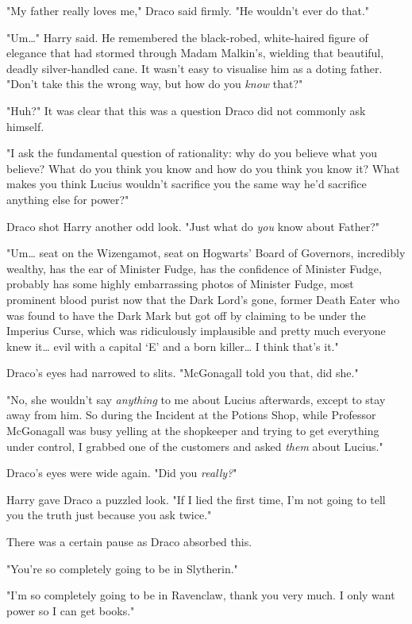 "My father really loves me," Draco said firmly. "He wouldn't ever do that."

"Um{\ldots}" Harry said. He remembered the black-robed, white-haired figure of
elegance that had stormed through Madam Malkin's, wielding that beautiful,
deadly silver-handled cane. It wasn't easy to visualise him as a doting father.
"Don't take this the wrong way, but how do you \emph{know} that?"

"Huh?" It was clear that this was a question Draco did not commonly ask himself.

"I ask the fundamental question of rationality: why do you believe what you
believe? What do you think you know and how do you think you know it? What
makes you think Lucius wouldn't sacrifice you the same way he'd sacrifice
anything else for power?"

Draco shot Harry another odd look. "Just what do \emph{you} know about Father?"

"Um{\ldots} seat on the Wizengamot, seat on Hogwarts' Board of Governors,
incredibly wealthy, has the ear of Minister Fudge, has the confidence of
Minister Fudge, probably has some highly embarrassing photos of Minister Fudge,
most prominent blood purist now that the Dark Lord's gone, former Death Eater
who was found to have the Dark Mark but got off by claiming to be under the
Imperius Curse, which was ridiculously implausible and pretty much everyone
knew it{\ldots} evil with a capital `E' and a born killer{\ldots} I think
that's it."

Draco's eyes had narrowed to slits. "McGonagall told you that, did she."

"No, she wouldn't say \emph{anything} to me about Lucius afterwards, except to
stay away from him. So during the Incident at the Potions Shop, while Professor
McGonagall was busy yelling at the shopkeeper and trying to get everything
under control, I grabbed one of the customers and asked \emph{them} about
Lucius."

Draco's eyes were wide again. "Did you \emph{really?}"

Harry gave Draco a puzzled look. "If I lied the first time, I'm not going to
tell you the truth just because you ask twice."

There was a certain pause as Draco absorbed this.

"You're so completely going to be in Slytherin."

"I'm so completely going to be in Ravenclaw, thank you very much. I only want
power so I can get books."

